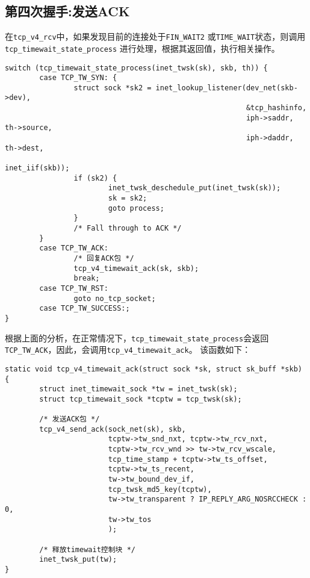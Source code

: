 	\subsection{第四次握手:发送ACK}
		在\texttt{tcp_v4_rcv}中，如果发现目前的连接处于\texttt{FIN_WAIT2}
		或\texttt{TIME_WAIT}状态，则调用\texttt{tcp_timewait_state_process}
		进行处理，根据其返回值，执行相关操作。

\begin{verbatim}
switch (tcp_timewait_state_process(inet_twsk(sk), skb, th)) {
        case TCP_TW_SYN: {
                struct sock *sk2 = inet_lookup_listener(dev_net(skb->dev),
                                                        &tcp_hashinfo,
                                                        iph->saddr, th->source,
                                                        iph->daddr, th->dest,
                                                        inet_iif(skb));
                if (sk2) {
                        inet_twsk_deschedule_put(inet_twsk(sk));
                        sk = sk2;
                        goto process;
                }
                /* Fall through to ACK */
        }
        case TCP_TW_ACK:
                /* 回复ACK包 */
                tcp_v4_timewait_ack(sk, skb);
                break;
        case TCP_TW_RST:
                goto no_tcp_socket;
        case TCP_TW_SUCCESS:;
}
\end{verbatim}
		根据上面的分析，在正常情况下，\texttt{tcp_timewait_state_process}会返回
		\texttt{TCP_TW_ACK}，因此，会调用\texttt{tcp_v4_timewait_ack}。
		该函数如下：
\begin{verbatim}
static void tcp_v4_timewait_ack(struct sock *sk, struct sk_buff *skb)
{
        struct inet_timewait_sock *tw = inet_twsk(sk);
        struct tcp_timewait_sock *tcptw = tcp_twsk(sk);

        /* 发送ACK包 */
        tcp_v4_send_ack(sock_net(sk), skb,
                        tcptw->tw_snd_nxt, tcptw->tw_rcv_nxt,
                        tcptw->tw_rcv_wnd >> tw->tw_rcv_wscale,
                        tcp_time_stamp + tcptw->tw_ts_offset,
                        tcptw->tw_ts_recent,
                        tw->tw_bound_dev_if,
                        tcp_twsk_md5_key(tcptw),
                        tw->tw_transparent ? IP_REPLY_ARG_NOSRCCHECK : 0,
                        tw->tw_tos
                        );

        /* 释放timewait控制块 */
        inet_twsk_put(tw);
}
\end{verbatim}
